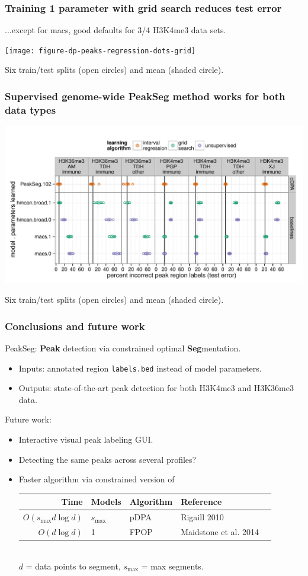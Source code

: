 \documentclass{beamer}
\begin{document}
\begin{frame}
  \frametitle{Training 1 parameter with grid search reduces test error}

  ...except for macs, good defaults for 3/4 H3K4me3 data sets.

  \texttt{[image: figure-dp-peaks-regression-dots-grid]}

  Six train/test splits (open circles) and mean (shaded circle).
\end{frame}

\begin{frame}
  \frametitle{Supervised genome-wide PeakSeg method works for both
    data types}

  \includegraphics[width=\textwidth]{figure-dp-peaks-regression-dots}

  Six train/test splits (open circles) and mean (shaded circle).
\end{frame}

\begin{frame}
  \frametitle{Conclusions and future work}
  PeakSeg: \textbf{Peak} detection via constrained optimal
  \textbf{Seg}mentation.
  \begin{itemize}
  \item Inputs: annotated region \texttt{labels.bed} instead of
    model parameters.
  \item Outputs: state-of-the-art peak detection for both H3K4me3 and
    H3K36me3 data.
  \end{itemize}
  Future work:
  \begin{itemize}
  \item Interactive visual peak labeling GUI.
  \item Detecting the same peaks across several profiles?
  \item Faster algorithm via constrained version of
    \begin{tabular}{rllll}
      Time & Models & Algorithm & Reference
      \\
      \hline
      $O( s_{\text{max}} d\log d)$ & $s_{\text{max}}$ &
      pDPA & Rigaill 2010
      \\
      $O(d\log d)$ & 1 & FPOP & Maidstone et al. 2014 %
    \end{tabular}
    \\
    $d$ = data points to segment, $s_{\text{max}}$ = max segments.
  \end{itemize}
\end{frame}
\end{document}
